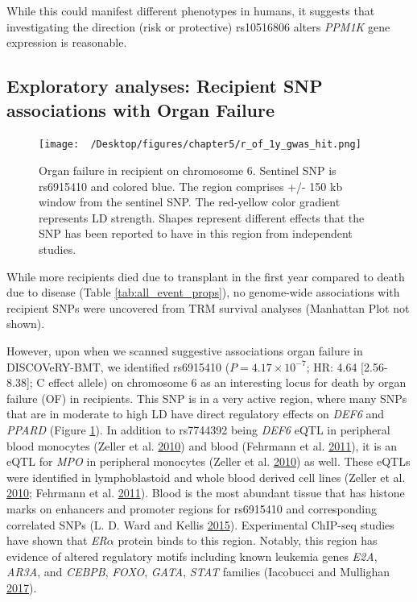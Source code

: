 \documentclass[]{DissertateOSU}
\begin{document}
While this could manifest different phenotypes in humans, it suggests
that investigating the direction (risk or protective) rs10516806 alters
\emph{PPM1K} gene expression is reasonable.

\subsection{Exploratory analyses: Recipient SNP associations with Organ
Failure}\label{exploratory-analyses-recipient-snp-associations-with-organ-failure}

\begin{figure}
    \centering
    \texttt{[image: ~/Desktop/figures/chapter5/r\_of\_1y\_gwas\_hit.png]}
    \caption[Organ failure in recipient on chromosome 6.]{Organ failure in recipient on chromosome 6. Sentinel SNP is rs6915410 and colored blue. The region comprises +/- 150 kb window from the sentinel SNP. The red-yellow color gradient represents LD strength. Shapes represent different effects that the SNP has been reported to have in this region from independent studies.}
    \label{fig:r_of_1y}  
\end{figure}

While more recipients died due to transplant in the first year compared
to death due to disease (Table \ref{tab:all_event_props}), no
genome-wide associations with recipient SNPs were uncovered from TRM
survival analyses (Manhattan Plot not shown).

However, upon when we scanned suggestive associations organ failure in
DISCOVeRY-BMT, we identified rs6915410 (\(P = 4.17\times{10}^{-7}\); HR:
4.64 {[}2.56-8.38{]}; C effect allele) on chromosome 6 as an interesting
locus for death by organ failure (OF) in recipients. This SNP is in a
very active region, where many SNPs that are in moderate to high LD have
direct regulatory effects on \emph{DEF6} and \emph{PPARD} (Figure
\ref{fig:r_of_1y}). In addition to rs7744392 being \emph{DEF6} eQTL in
peripheral blood monocytes (Zeller et al.
\protect\hyperlink{ref-Zeller_2010}{2010}) and blood (Fehrmann et al.
\protect\hyperlink{ref-Fehrmann_2011}{2011}), it is an eQTL for
\emph{MPO} in peripheral monocytes (Zeller et al.
\protect\hyperlink{ref-Zeller_2010}{2010}) as well. These eQTLs were
identified in lymphoblastoid and whole blood derived cell lines (Zeller
et al. \protect\hyperlink{ref-Zeller_2010}{2010}; Fehrmann et al.
\protect\hyperlink{ref-Fehrmann_2011}{2011}). Blood is the most abundant
tissue that has histone marks on enhancers and promoter regions for
rs6915410 and corresponding correlated SNPs (L. D. Ward and Kellis
\protect\hyperlink{ref-haploreg}{2015}). Experimental ChIP-seq studies
have shown that \textit{ER$\alpha$} protein binds to this region.
Notably, this region has evidence of altered regulatory motifs including
known leukemia genes \emph{E2A}, \emph{AR3A}, and \emph{CEBPB},
\emph{FOXO}, \emph{GATA}, \emph{STAT} families (Iacobucci and Mullighan
\protect\hyperlink{ref-Iacobucci_2017}{2017}).
\end{document}
